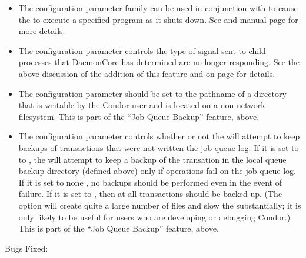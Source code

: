 \begin{itemize}
\item The configuration parameter family
   can be used in conjunction
  with  to cause the  to execute
  a specified program as it shuts down.  See
  \pageref{param:MasterShutdownProgram} and 
  manual page for more details.

\item The configuration parameter
   controls the type of signal
  sent to child processes that DaemonCore has determined are no longer
  responding.  See the above discussion of the addition of this
  feature and  on page
  \pageref{param:NotRespondingWantCore} for details.

\item The configuration parameter 
  should be set to the pathname of a directory that is writable by
  the Condor user and is located on a non-network filesystem.
  This is part of the ``Job Queue Backup'' feature, above.

\item The configuration parameter
   controls whether or not the
   will attempt to keep backups of transactions that
  were not written the job queue log.  If it is set to to
  , the  will attempt to keep a backup
  of the transation in the local queue backup directory (defined
  above) only if operations fail on the job queue log.  If it is set
  to none , no backups should be performed even in the
  event of failure.  If it is set to , then at all
  transactions should be backed up.  (The  option will
  create quite a large number of files and slow the 
  substantially; it is only likely to be useful for users who are
  developing or debugging Condor.)
  This is part of the ``Job Queue Backup'' feature, above.

\end{itemize}

\noindent Bugs Fixed:

